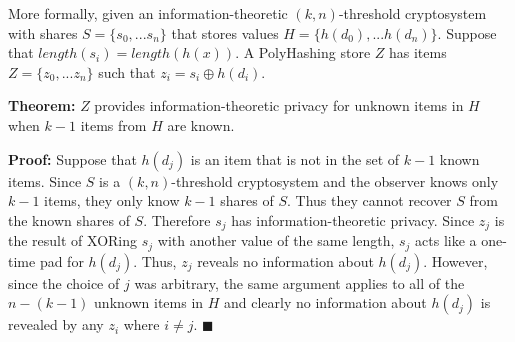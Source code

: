 More formally, given an information-theoretic $(k,n)$-threshold cryptosystem 
with shares $S=\{s_0, ... s_n\}$ that stores values $H=\{h(d_0), ... h(d_n)\}$.
Suppose that $length(s_i) = length(h(x))$. A PolyHashing 
store $Z$ has items $Z=\{z_0, ...z_n\}$ such that $z_i= s_i \oplus h(d_i)$.   

{\bf Theorem:} $Z$ provides information-theoretic 
privacy for unknown items in $H$ when $k-1$ items from $H$ are known.


{\bf Proof:}
Suppose that $h(d_j)$ is an item that is not in the set of $k-1$ known items.
Since $S$ is a $(k,n)$-threshold cryptosystem and the observer knows only 
$k-1$ items, they only know $k-1$ shares of $S$.   Thus they cannot recover 
$S$ from the known shares of $S$.   Therefore $s_j$ has information-theoretic 
privacy.   Since $z_j$ is 
the result of XORing $s_j$ with another value of the same length, $s_j$ acts 
like a one-time pad for $h(d_j)$.   Thus, $z_j$ reveals no information
about $h(d_j)$.   However, since the choice of $j$ was 
arbitrary, the same argument applies to all of the $n-(k-1)$ unknown items in 
$H$ and clearly no information about $h(d_j)$ is revealed by any $z_i$ where
$i \neq j$.  
$\blacksquare$



